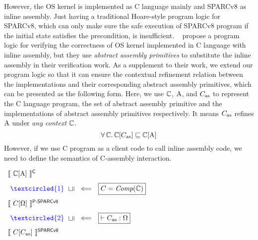 However, the OS kernel is implemented as
C language mainly and SPARCv8 as inline assembly.
Just having a traditional Hoare-style
program logic for SPARCv8, which can only make sure
the safe execution of SPARCv8 program if the initial
state satisfies the precondition, is insufficient.
~\cite{Xu16cav} propose a program logic for
verifying the correctness of OS kernel implemented in
C language with inline assembly,
but they use {\em abstract assembly primitives} to
substitute the inline assembly in their verification work.
As a supplement to their work, we extend our
program logic so that it can ensure the
contextual refinement relation between the implementations
and their corresponding abstract assembly primitives,
which can be presented as the following form. Here,
we use $\mathbb{C}$, $\text{A}$, and $C_{\text{as}}$ to represent
the C language program, the set of abstract assembly
primitive and the implementations of
abstract assembly primitives respectively.
It means $C_{\text{as}}$ refines $\text{A}$ under
\textit{any context} $\mathbb{C}$.
\[
    \forall \, \mathbb{C}. \,
    \mathbb{C}[C_{\text{as}}] \sqsubseteq \mathbb{C}[\text{A}]
\]
However, if we use C program as a client code to
call inline assembly code, we need to define the
semantics of C-assembly interaction.
\begin{center}
    $
        \begin{array}{l}
            \semantics{\Clang[\AbsPrimC]}^{\textsf{C}}
            \\
            \\[-5pt]
            \
            {\color{blue} \textcircled{1}} \ \
            \rotatebox[origin=c]{90}{$\refine$} \ \
            \Longleftarrow \ \
            \boxed{C = \textit{Comp}(\Clang)}
            \\
            \\[-5pt]
            \semantics{\code[\hprimset]}^{\textsf{P-SPARCv8}}
            \\
            \\[-5pt]
            \
            {\color{blue} \textcircled{2}} \ \
            \rotatebox[origin=c]{90}{$\refine$} \ \
            \Longleftarrow \ \
            \boxed{\vdash\asmimp:\hprimset}
            \\
            \\[-5pt]
            \semantics{\code[\asmimp]}^{\textsf{SPARCv8}}
        \end{array}
    $
    \label{fig:idea to establish contextual refinement}
\end{center}
